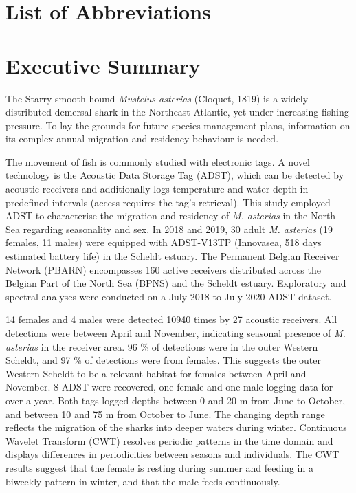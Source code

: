 \documentclass[
  authoryear,
  review,
  3p]{elsarticle}
\renewcommand*\contentsname{Table of contents}
\newcommand\contentsname{Table of contents}
\begin{document}
\renewcommand*\contentsname{Table of contents}
{
\hypersetup{linkcolor=}
\setcounter{tocdepth}{3}
\tableofcontents
}
\newpage{}

\hypertarget{list-of-abbreviations}{%
\section*{List of Abbreviations}\label{list-of-abbreviations}}

\newpage{}

\hypertarget{executive-summary}{%
\section*{Executive Summary}\label{executive-summary}}

The Starry smooth-hound \emph{Mustelus asterias} (Cloquet, 1819) is a
widely distributed demersal shark in the Northeast Atlantic, yet under
increasing fishing pressure. To lay the grounds for future species
management plans, information on its complex annual migration and
residency behaviour is needed.

The movement of fish is commonly studied with electronic tags. A novel
technology is the Acoustic Data Storage Tag (ADST), which can be
detected by acoustic receivers and additionally logs temperature and
water depth in predefined intervals (access requires the tag's
retrieval). This study employed ADST to characterise the migration and
residency of \emph{M. asterias} in the North Sea regarding seasonality
and sex. In 2018 and 2019, 30 adult \emph{M. asterias} (19 females, 11
males) were equipped with ADST-V13TP (Innovasea, 518 days estimated
battery life) in the Scheldt estuary. The Permanent Belgian Receiver
Network (PBARN) encompasses 160 active receivers distributed across the
Belgian Part of the North Sea (BPNS) and the Scheldt estuary.
Exploratory and spectral analyses were conducted on a July 2018 to July
2020 ADST dataset.

14 females and 4 males were detected 10940 times by 27 acoustic
receivers. All detections were between April and November, indicating
seasonal presence of \emph{M. asterias} in the receiver area. 96 \% of
detections were in the outer Western Scheldt, and 97 \% of detections
were from females. This suggests the outer Western Scheldt to be a
relevant habitat for females between April and November. 8 ADST were
recovered, one female and one male logging data for over a year. Both
tags logged depths between 0 and 20 m from June to October, and between
10 and 75 m from October to June. The changing depth range reflects the
migration of the sharks into deeper waters during winter. Continuous
Wavelet Transform (CWT) resolves periodic patterns in the time domain
and displays differences in periodicities between seasons and
individuals. The CWT results suggest that the female is resting during
summer and feeding in a biweekly pattern in winter, and that the male
feeds continuously.
\end{document}
